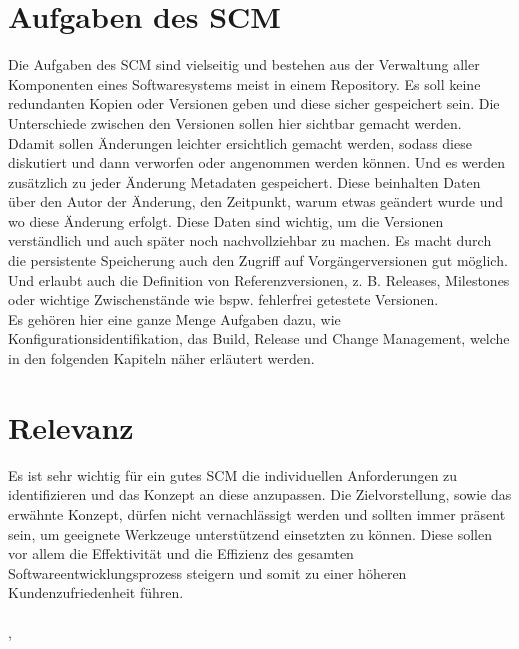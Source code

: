 \section{Aufgaben des SCM}
Die Aufgaben des \acs{SCM} sind vielseitig und bestehen aus der Verwaltung aller Komponenten eines Softwaresystems meist in einem Repository. Es soll keine redundanten Kopien oder Versionen geben und diese sicher gespeichert sein. Die Unterschiede zwischen den Versionen sollen hier sichtbar gemacht werden. Ddamit sollen Änderungen leichter ersichtlich gemacht werden, sodass diese diskutiert und dann verworfen oder angenommen werden können. Und es werden zusätzlich zu jeder Änderung Metadaten gespeichert. Diese beinhalten Daten über den Autor der Änderung, den Zeitpunkt, warum etwas geändert wurde und wo diese Änderung erfolgt. Diese Daten sind wichtig, um die Versionen verständlich und auch später noch nachvollziehbar zu machen. Es macht durch die persistente Speicherung auch den Zugriff auf Vorgängerversionen gut möglich. Und erlaubt auch die Definition von Referenzversionen, \acs{z. B.} Releases, Milestones oder wichtige Zwischenstände wie bspw. fehlerfrei getestete Versionen.
\\
Es gehören hier eine ganze Menge Aufgaben dazu, wie Konfigurationsidentifikation,  das Build, Release und Change Management, welche in den folgenden Kapiteln näher erläutert werden.
\cite{scm-unibonn}
\section{Relevanz}
Es ist sehr wichtig für ein gutes \acs{SCM} die individuellen Anforderungen zu identifizieren und das Konzept an diese anzupassen. Die Zielvorstellung, sowie das erwähnte Konzept, dürfen nicht vernachlässigt werden und sollten immer präsent sein, um geeignete Werkzeuge unterstützend einsetzten zu können. Diese sollen vor allem die Effektivität und die Effizienz des gesamten Softwareentwicklungsprozess steigern und somit zu einer höheren Kundenzufriedenheit führen.
\\\\
\cite{scm-agil}, \cite{scm-pearson}
